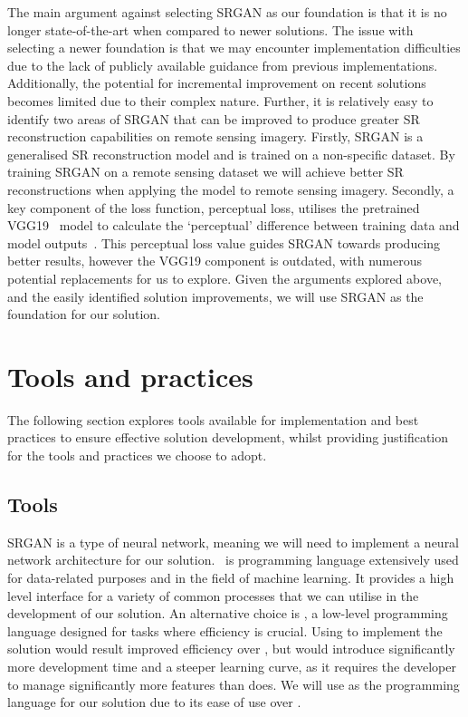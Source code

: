 The main argument against selecting SRGAN as our foundation is that it is no longer state-of-the-art when compared to newer solutions. The issue with selecting a newer foundation is that we may encounter implementation difficulties due to the lack of publicly available guidance from previous implementations. Additionally, the potential for incremental improvement on recent solutions becomes limited due to their complex nature. Further, it is relatively easy to identify two areas of SRGAN that can be improved to produce greater SR reconstruction capabilities on remote sensing imagery. Firstly, SRGAN is a generalised SR reconstruction model and is trained on a non-specific dataset. By training SRGAN on a remote sensing dataset we will achieve better SR reconstructions when applying the model to remote sensing imagery. Secondly, a key component of the loss function, perceptual loss, utilises the pretrained VGG19~\cite{vgg19} model to calculate the `perceptual' difference between training data and model outputs~\cite{srgan}. This perceptual loss value guides SRGAN towards producing better results, however the VGG19 component is outdated, with numerous potential replacements for us to explore. Given the arguments explored above, and the easily identified solution improvements, we will use SRGAN as the foundation for our solution.

\section{Tools and practices}
The following section explores tools available for implementation and best practices to ensure effective solution development, whilst providing justification for the tools and practices we choose to adopt.

\subsection{Tools}
SRGAN is a type of neural network, meaning we will need to implement a neural network architecture for our solution.\  is programming language extensively used for data-related purposes and in the field of machine learning. It provides a high level interface for a variety of common processes that we can utilise in the development of our solution. An alternative choice is , a low-level programming language designed for tasks where efficiency is crucial. Using  to implement the solution would result improved efficiency over , but would introduce significantly more development time and a steeper learning curve, as it requires the developer to manage significantly more features than  does. We will use  as the programming language for our solution due to its ease of use over .

